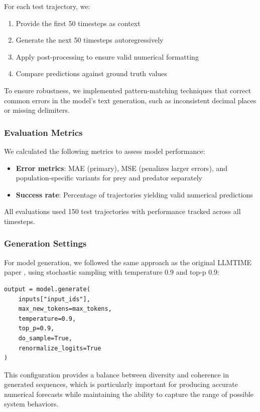 \documentclass{article}
\begin{document}
For each test trajectory, we:
\begin{enumerate}
    \item Provide the first 50 timesteps as context
    \item Generate the next 50 timesteps autoregressively
    \item Apply post-processing to ensure valid numerical formatting
    \item Compare predictions against ground truth values
\end{enumerate}

To ensure robustness, we implemented pattern-matching techniques that correct common errors in the model's text generation, such as inconsistent decimal places or missing delimiters.

\subsubsection*{Evaluation Metrics}

We calculated the following metrics to assess model performance:
\begin{itemize}
    \item \textbf{Error metrics}: MAE (primary), MSE (penalizes larger errors), and population-specific variants for prey and predator separately
    \item \textbf{Success rate}: Percentage of trajectories yielding valid numerical predictions
\end{itemize}

All evaluations used 150 test trajectories with performance tracked across all timesteps.

\subsubsection*{Generation Settings}

For model generation, we followed the same approach as the original LLMTIME paper \cite{gruver2023large}, using stochastic sampling with temperature 0.9 and top-p 0.9:

\begin{verbatim}
output = model.generate(
    inputs["input_ids"],
    max_new_tokens=max_tokens,
    temperature=0.9,
    top_p=0.9,
    do_sample=True,
    renormalize_logits=True
)
\end{verbatim}

This configuration provides a balance between diversity and coherence in generated sequences, which is particularly important for producing accurate numerical forecasts while maintaining the ability to capture the range of possible system behaviors.
\end{document}
